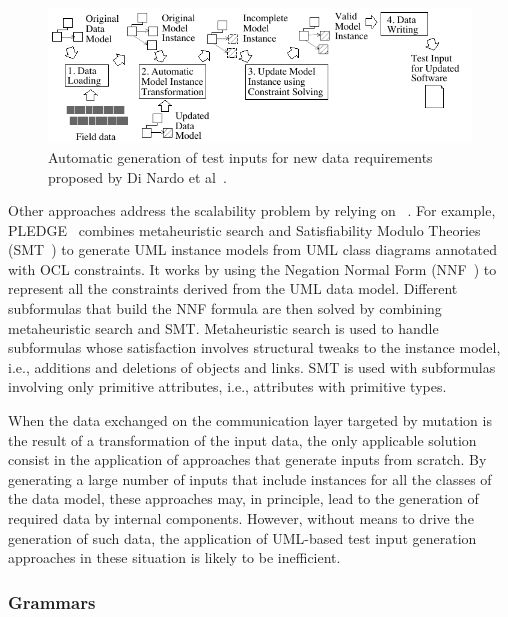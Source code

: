 \begin{figure}[t!]
  \centering
    \includegraphics{images/DiNardoTOSEM}
      \caption{Automatic generation of test inputs for new data requirements proposed by Di Nardo et al~\cite{di2017augmenting}.}
      \label{fig:DiNardo}
\end{figure}

Other approaches address the scalability problem by relying on ~\cite{soltana2019practical}.
For example, PLEDGE~\cite{soltana2019practical} combines metaheuristic search and Satisfiability Modulo Theories (SMT~\cite{SMT:2011}) to generate UML instance models from UML class diagrams annotated with OCL constraints. It  works by using the Negation Normal Form (NNF~\cite{NNF:2001}) to represent all the constraints derived from the UML data model. Different subformulas that build the NNF formula are then solved by combining metaheuristic search and SMT. Metaheuristic search is used to handle subformulas whose satisfaction involves structural tweaks to the instance model, i.e., additions and deletions of objects and links. SMT is used with subformulas involving only primitive attributes, i.e., attributes with primitive types. 


When the data exchanged on the communication layer targeted by mutation is the result of a transformation of the input data, the only applicable solution consist in the application of approaches that generate inputs from scratch. By generating a large number of inputs that include instances for all the classes of the data model, these approaches may, in principle, lead to the generation of required data by internal components. However, without means to drive the generation of such data, the application of UML-based test input generation approaches in these situation is likely to be inefficient.


\subsubsection{Grammars}

